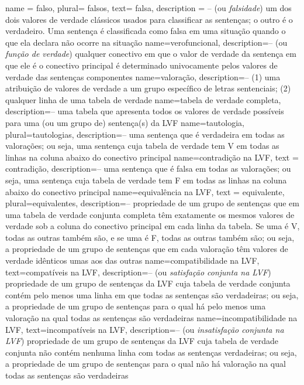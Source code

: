 {
name = falso,
plural= falsos,
text= falsa,
description = {-- (ou \textit{falsidade}) um dos dois valores de verdade clássicos usados para classificar as sentenças; o outro é o verdadeiro. Uma sentença é classificada como falsa em uma situação quando o que ela declara não ocorre na situação}
}
{
name=verofuncional,
description={-- (ou \textit{função de verdade}) qualquer conectivo em que o valor de verdade da sentença em que ele é o conectivo principal é determinado univocamente pelos valores de verdade das sentenças componentes}
}
{
name=valoração,
description={-- (1) uma atribuição de valores de verdade a um grupo específico de letras sentenciais; (2) qualquer linha de uma tabela de verdade}
}
{
name=tabela de verdade completa,
description={-- uma tabela que apresenta todos os valores de verdade possíveis para uma (ou um grupo de) sentença(s) da LVF}
}
{
name=tautologia,
plural=tautologias,
description={-- uma sentença que é verdadeira em todas as valorações; ou seja, uma sentença cuja tabela de verdade tem V em todas as linhas na coluna abaixo do conectivo principal}
}
{
  name=contradição na LVF,
  text = contradição,
description={-- uma sentença que é falsa em todas as valorações; ou seja, uma sentença cuja tabela de verdade tem F em todas as linhas na coluna abaixo do conectivo principal}
}
{
  name=equivalência na LVF,
  text = equivalente,
  plural=equivalentes,
description={-- propriedade de um grupo de sentenças que em uma tabela de verdade conjunta completa têm exatamente os mesmos valores de verdade sob a coluna do conectivo principal em cada linha da tabela. Se uma é V, todas as outras também são, e se uma é F, todas as outras também são; ou seja, a propriedade de um grupo de sentenças que em cada valoração têm valores de verdade idênticos umas aos das outras}
}
{
  name=compatibilidade na LVF,
  text=compatíveis na LVF,
description={-- (ou \textit{satisfação conjunta na LVF}) propriedade de um grupo de sentenças da LVF cuja tabela de verdade conjunta contém pelo menos uma linha em que todas as sentenças são verdadeiras; ou seja, a propriedade de um grupo de sentenças para o qual há pelo menos uma valoração na qual todas as sentenças são verdadeiras}
}
{
  name=incompatibilidade na LVF,
  text=incompatíveis na LVF,
description={-- (ou \textit{insatisfação conjunta na LVF}) propriedade de um grupo de sentenças da LVF cuja tabela de verdade conjunta não contém nenhuma linha com todas as sentenças verdadeiras; ou seja, a propriedade de um grupo de sentenças para o qual não há valoração na qual todas as sentenças são verdadeiras}
}
